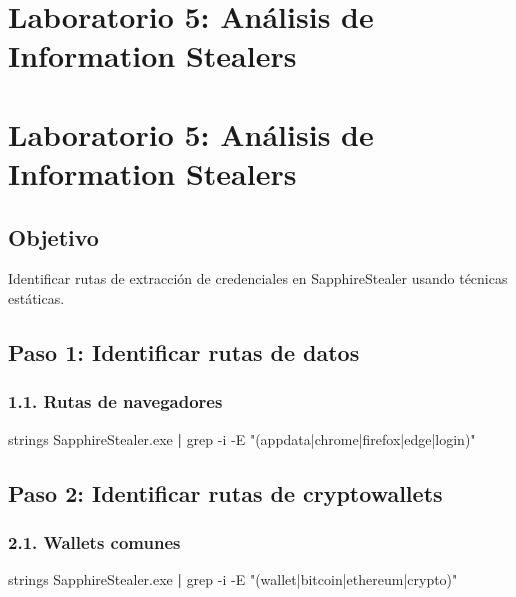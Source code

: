 \documentclass[
  letterpaper,
]{report}
\newenvironment{Shaded}{\begin{snugshade}}{\end{snugshade}}
\newcommand{\AttributeTok}[1]{\textcolor[rgb]{0.40,0.45,0.13}{#1}}
\newcommand{\FunctionTok}[1]{\textcolor[rgb]{0.28,0.35,0.67}{#1}}
\newcommand{\KeywordTok}[1]{\textcolor[rgb]{0.00,0.23,0.31}{\textbf{#1}}}
\newcommand{\NormalTok}[1]{\textcolor[rgb]{0.00,0.23,0.31}{#1}}
\newcommand{\StringTok}[1]{\textcolor[rgb]{0.13,0.47,0.30}{#1}}
\begin{document}
\chapter{Laboratorio 5: Análisis de Information
Stealers}\label{laboratorio-5-anuxe1lisis-de-information-stealers}

\chapter{Laboratorio 5: Análisis de Information
Stealers}\label{laboratorio-5-anuxe1lisis-de-information-stealers-1}

\section{Objetivo}\label{objetivo-4}

Identificar rutas de extracción de credenciales en SapphireStealer
usando técnicas estáticas.

\section{Paso 1: Identificar rutas de
datos}\label{paso-1-identificar-rutas-de-datos}

\subsection{1.1. Rutas de navegadores}\label{rutas-de-navegadores}

\begin{Shaded}
\begin{Highlighting}[]
\FunctionTok{strings}\NormalTok{ SapphireStealer.exe }\KeywordTok{|} \FunctionTok{grep} \AttributeTok{{-}i} \AttributeTok{{-}E} \StringTok{"(appdata|chrome|firefox|edge|login)"}
\end{Highlighting}
\end{Shaded}

\section{Paso 2: Identificar rutas de
cryptowallets}\label{paso-2-identificar-rutas-de-cryptowallets}

\subsection{2.1. Wallets comunes}\label{wallets-comunes}

\begin{Shaded}
\begin{Highlighting}[]
\FunctionTok{strings}\NormalTok{ SapphireStealer.exe }\KeywordTok{|} \FunctionTok{grep} \AttributeTok{{-}i} \AttributeTok{{-}E} \StringTok{"(wallet|bitcoin|ethereum|crypto)"}
\end{Highlighting}
\end{Shaded}
\end{document}

